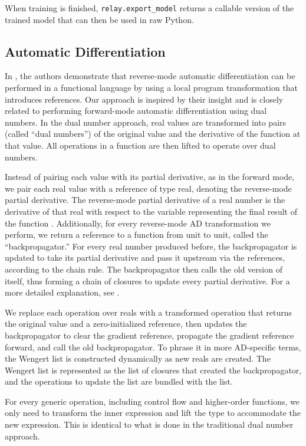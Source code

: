 When training is finished, \texttt{relay.export\_model} returns a callable
version of the trained model that can then be used in raw Python.

\subsection{Automatic Differentiation}
\label{sec:autodiff}

In \cite{toplas_reverse}, the authors demonstrate that reverse-mode automatic
differentiation can be performed in a functional language by using a local
program transformation that introduces references.
Our approach is inspired by their insight and is closely related
to performing forward-mode automatic differentiation using dual numbers.
In the dual number approach, real values are transformed into pairs (called ``dual numbers'')
of the original value and the derivative of the function at that value. All
operations in a function are then lifted to operate over dual numbers.

Instead of pairing each value with its partial derivative, as in the forward mode, we pair each real value
with a reference of type real, denoting the reverse-mode partial derivative. The reverse-mode partial
derivative of a real number is the derivative of that real with respect to the variable representing
the final result of the function \cite{colah}. Additionally, for every reverse-mode AD transformation
we perform, we return a reference to a function from unit to unit, called the ``backpropagator.''
For every real number produced before, the backpropagator is updated to take its partial derivative
and pass it upstream via the references, according to the chain rule. The backpropagator then
calls the old version of itself, thus forming a chain of closures to update every partial derivative.
For a more detailed explanation, see \cite{toplas_reverse}.

We replace each operation over reals with a transformed operation that returns
the original value and a zero-initialized reference, then updates the
backpropagator to clear the gradient reference, propagate the gradient
reference forward, and call the old backpropagator.
To phrase it in more AD-specific terms, the Wengert list is constructed
dynamically as new reals are created. The Wengert list is represented as the
list of closures that created the backpropagator, and the operations to update
the list are bundled with the list.

For every generic operation, including control flow and higher-order functions, we only need to
transform the inner expression and lift the type to accommodate the new expression.
This is identical to what is done in the traditional dual number approach.

